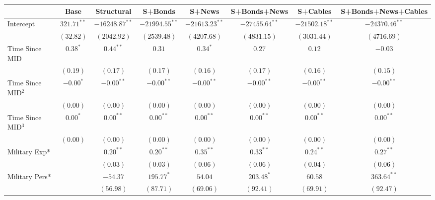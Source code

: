 
\begin{table}
\begin{center}
\begin{footnotesize}
\begin{tabular}{l c c c c c c c}
\hline
 & Base & Structural & S+Bonds & S+News & S+Bonds+News & S+Cables & S+Bonds+News+Cables \\
\hline
Intercept              & $321.71^{**}$ & $-16248.87^{**}$ & $-21994.55^{**}$ & $-21613.23^{**}$ & $-27455.64^{**}$ & $-21502.18^{**}$ & $-24370.46^{**}$ \\
                       & $(32.82)$     & $(2042.92)$      & $(2539.48)$      & $(4207.68)$      & $(4831.15)$      & $(3031.44)$      & $(4716.69)$      \\
Time Since MID         & $0.38^{*}$    & $0.44^{**}$      & $0.31$           & $0.34^{*}$       & $0.27$           & $0.12$           & $-0.03$          \\
                       & $(0.19)$      & $(0.17)$         & $(0.17)$         & $(0.16)$         & $(0.17)$         & $(0.16)$         & $(0.15)$         \\
Time Since MID$^2$     & $-0.00^{*}$   & $-0.00^{**}$     & $-0.00^{**}$     & $-0.00^{**}$     & $-0.00^{**}$     & $-0.00^{**}$     & $-0.00^{**}$     \\
                       & $(0.00)$      & $(0.00)$         & $(0.00)$         & $(0.00)$         & $(0.00)$         & $(0.00)$         & $(0.00)$         \\
Time Since MID$^3$     & $0.00^{*}$    & $0.00^{**}$      & $0.00^{**}$      & $0.00^{**}$      & $0.00^{**}$      & $0.00^{**}$      & $0.00^{**}$      \\
                       & $(0.00)$      & $(0.00)$         & $(0.00)$         & $(0.00)$         & $(0.00)$         & $(0.00)$         & $(0.00)$         \\
Military Exp*          &               & $0.20^{**}$      & $0.20^{**}$      & $0.35^{**}$      & $0.33^{**}$      & $0.24^{**}$      & $0.27^{**}$      \\
                       &               & $(0.03)$         & $(0.03)$         & $(0.06)$         & $(0.06)$         & $(0.04)$         & $(0.06)$         \\
Military Pers*         &               & $-54.37$         & $195.77^{*}$     & $54.04$          & $203.48^{*}$     & $60.58$          & $363.64^{**}$    \\
                       &               & $(56.98)$        & $(87.71)$        & $(69.06)$        & $(92.41)$        & $(69.91)$        & $(92.47)$        \\

\end{tabular}
\end{footnotesize}
\end{center}
\end{table}
